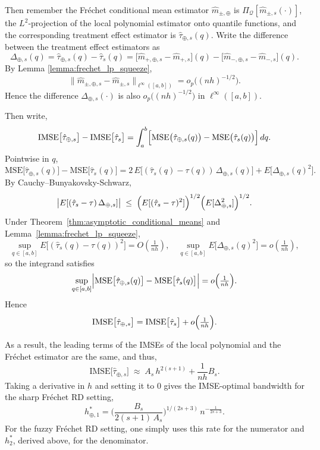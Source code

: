 \documentclass[12pt]{article}
\begin{document}
Then remember the Fr\'echet conditional mean estimator $\hat{m}_{\pm,\oplus}$ is
$\Pi_{\!\mathcal{Q}}[\hat{m}_{\pm,s}(\cdot)]$, 
the $L^2$‐projection of the local polynomial estimator onto quantile functions, and the corresponding treatment effect estimator is $\hat{\tau}_{\oplus,s}(q)$.
Write the difference between the treatment effect estimators as
\[
  \Delta_{\oplus,s}(q)
  =
  \hat{\tau}_{\oplus,s}(q)-\hat{\tau}_{s}(q)
  =
  \bigl[\hat{m}_{+,\oplus, s}-\hat{m}_{+,s}\bigr](q)
  -
  \bigl[\hat{m}_{-,\oplus, s}-\hat{m}_{-,s}\bigr](q).
\]
By Lemma \ref{lemma:frechet_lp_squeeze},
\[
  \bigl\|\hat{m}_{\pm,\oplus,s}-\hat{m}_{\pm,s}\bigr\|_{\ell^\infty([a,b])}
  =
  o_{p}\bigl((n h)^{-1/2}\bigr).
\]
Hence the difference $\Delta_{\oplus, s}(\cdot)$ is also $o_{p}\bigl((n h)^{-1/2}\bigr)$ in $\ell^\infty([a,b])$. 

Then write, 
\[
\mathrm{IMSE}\bigl[\hat{\tau}_{\oplus, s}\bigr]
  -
\mathrm{IMSE}\bigl[\hat{\tau}_{s}\bigr]
  =
  \int_{a}^{b}
  \Bigl[
\mathrm{MSE}\bigl(\hat{\tau}_{\oplus, s}(q)\bigr)
    - \mathrm{MSE}\bigl(\hat{\tau}_{s}(q)\bigr)
  \Bigr]\,dq.
\]
Pointwise in $q$,
\[
\mathrm{MSE}\bigl[\hat{\tau}_{\oplus, s}(q)\bigr]
  -
  \mathrm{MSE}\bigl[\hat{\tau}_{s}(q)\bigr]
  =
2\,E\bigl[(\hat{\tau}_{s}(q)-\tau(q))\,\Delta_{\oplus, s}(q)\bigr]
  +
E\bigl[\Delta_{\oplus, s}(q)^{2}\bigr].
\]
By Cauchy–Bunyakovsky-Schwarz,
\[
\bigl|E[(\hat{\tau}_{s}-\tau)\,\Delta_{\oplus, s}]\bigr|
\;\le\;
\Bigl(E[(\hat{\tau}_{s}-\tau)^2]\Bigr)^{1/2}
\Bigl(E[\Delta_{\oplus,s}^2]\Bigr)^{1/2}.
\]
Under Theorem~\ref{thm:asymptotic_conditional_means} and Lemma~\ref{lemma:frechet_lp_squeeze},
\[
\sup_{q\in[a,b]}E\bigl[(\hat{\tau}_{s}(q)-\tau(q))^2\bigr]=O\left(\tfrac{1}{nh}\right),
\quad
\sup_{q\in[a,b]}E\bigl[\Delta_{\oplus,s}(q)^2\bigr]=o\left(\tfrac{1}{nh}\right),
\]
so the integrand satisfies
\[
\sup_{q\in[a,b]}
\Bigl|
\mathrm{MSE}\bigl[\hat{\tau}_{\oplus, s}(q)\bigr]
  -
  \mathrm{MSE}\bigl[\hat{\tau}_{s}(q)\bigr]
\Bigr|
=
o\Bigl(\tfrac{1}{nh}\Bigr).
\]
Hence
\[
\mathrm{IMSE}\bigl[\hat{\tau}_{\oplus, s}\bigr]
  =
\mathrm{IMSE}\bigl[\hat{\tau}_{s}\bigr]
  +
 o\Bigl(\tfrac{1}{nh}\Bigr).
\]

As a result, the leading terms of the IMSEs of the local polynomial and the Fr\'echet estimator are the same, and thus,
\begin{equation} \label{eq:h_imse}
\mathrm{IMSE}\bigl[\hat{\tau}_{\oplus,s}\bigr]
  \;\approx\;
  A_{s}\,h^{2(s+1)}
  +
  \frac{1}{nh} B_{s}.
\end{equation}
Taking a derivative in $h$ and setting it to $0$ gives the IMSE-optimal bandwidth for the sharp Fr\'echet RD setting,
\[
  h_{\oplus, 1}^*
  =
  \biggl(\frac{B_{s}}{2(s+1)\,A_{s}}\biggr)^{\!1/(2s+3)}\,
  n^{-\tfrac{1}{2s+3}}.
\]
For the fuzzy Fr\'echet RD setting, one simply uses this rate for the numerator and $h_2^*$, derived above, for the denominator.
\end{document}
